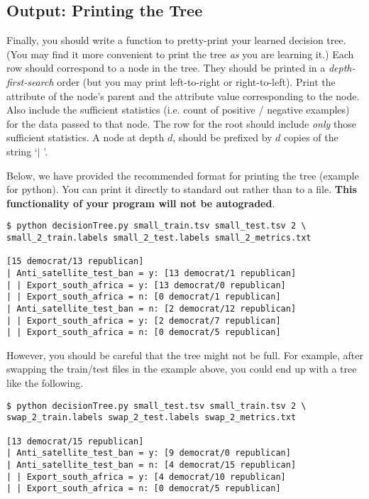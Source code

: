 \documentclass[11pt,addpoints,answers]{exam}
\begin{document}
\subsection{Output: Printing the Tree}
\label{sec:printtree}

Finally, you should write a function to pretty-print your learned decision tree. (You may find it more convenient to print the tree \emph{as} you are learning it.) Each row should correspond to a node in the tree. They should be printed in a \emph{depth-first-search} order (but you may print left-to-right or right-to-left). Print the attribute of the node's parent and the attribute value corresponding to the node. Also include the sufficient statistics (i.e. count of positive / negative examples) for the data passed to that node. The row for the root should include \emph{only} those sufficient statistics. A node at depth $d$, should be prefixed by $d$ copies of the string `$\mid$ '.

Below, we have provided the recommended format for printing the tree (example for python). You can print it directly to standard out rather than to a file. \textbf{This functionality of your program will not be autograded}.

\begin{lstlisting}[language=Shell]
$ python decisionTree.py small_train.tsv small_test.tsv 2 \ 
small_2_train.labels small_2_test.labels small_2_metrics.txt

[15 democrat/13 republican]
| Anti_satellite_test_ban = y: [13 democrat/1 republican]
| | Export_south_africa = y: [13 democrat/0 republican]
| | Export_south_africa = n: [0 democrat/1 republican]
| Anti_satellite_test_ban = n: [2 democrat/12 republican]
| | Export_south_africa = y: [2 democrat/7 republican]
| | Export_south_africa = n: [0 democrat/5 republican]
\end{lstlisting}

However, you should be careful that the tree might not be full. For example, after swapping the train/test files in the example above, you could end up with a tree like the following.

\begin{lstlisting}[language=Shell]
$ python decisionTree.py small_test.tsv small_train.tsv 2 \ 
swap_2_train.labels swap_2_test.labels swap_2_metrics.txt

[13 democrat/15 republican]
| Anti_satellite_test_ban = y: [9 democrat/0 republican]
| Anti_satellite_test_ban = n: [4 democrat/15 republican]
| | Export_south_africa = y: [4 democrat/10 republican]
| | Export_south_africa = n: [0 democrat/5 republican]
\end{lstlisting}
\end{document}
